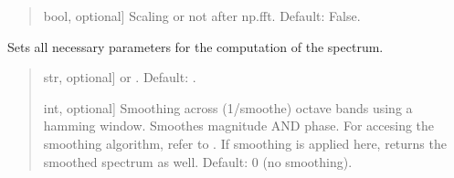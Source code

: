 \documentclass[letterpaper,10pt,english]{sphinxmanual}
\begin{document}
\begin{fulllineitems}
\begin{fulllineitems}
\begin{quote}
\begin{description}
\begin{description}
\sphinxlineitem{\sphinxstylestrong{scaling}}{[}bool, optional{]}
\sphinxAtStartPar
Scaling or not after np.fft. Default: False.

\end{description}

\end{description}\end{quote}

\end{fulllineitems}


\begin{fulllineitems}
\label{\detokenize{classes:dsptools.classes.signal_class.Signal.set_spectrum_parameters}}
\pysigstartsignatures
{}
\pysigstopsignatures
\sphinxAtStartPar
Sets all necessary parameters for the computation of the spectrum.
\begin{quote}\begin{description}
\begin{description}
\sphinxlineitem{\sphinxstylestrong{method}}{[}str, optional{]}
\sphinxAtStartPar
{} or . Default: .

\sphinxlineitem{\sphinxstylestrong{smoothe}}{[}int, optional{]}
\sphinxAtStartPar
Smoothing across (1/smoothe) octave bands using a hamming
window. Smoothes magnitude AND phase. For accesing the smoothing
algorithm, refer to
.
If smoothing is applied here,  returns
the smoothed spectrum as well.
Default: 0 (no smoothing).


\end{description}
\end{description}
\end{quote}
\end{fulllineitems}
\end{fulllineitems}
\end{document}
